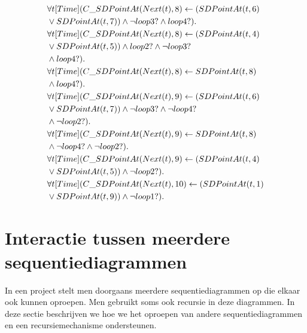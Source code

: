 \begin{align*}
	&\forall{t}[Time](C\_SDPointAt(Next(t), 8) \leftarrow (SDPointAt(t, 6) \\ &\lor SDPointAt(t, 7)) \land \lnot loop3? \land loop4?). \\
	&\forall{t}[Time](C\_SDPointAt(Next(t), 8) \leftarrow (SDPointAt(t, 4) \\ &\lor SDPointAt(t, 5)) \land loop2? \land \lnot loop3? \\ &\land loop4?). \\
	&\forall{t}[Time](C\_SDPointAt(Next(t), 8) \leftarrow SDPointAt(t, 8) \\ &\land loop4?). \\
	&\forall{t}[Time](C\_SDPointAt(Next(t), 9) \leftarrow (SDPointAt(t, 6) \\ &\lor SDPointAt(t, 7)) \land \lnot loop3? \land \lnot loop4? \\ &\land \lnot loop2?). \\
	&\forall{t}[Time](C\_SDPointAt(Next(t), 9) \leftarrow SDPointAt(t, 8) \\ &\land \lnot loop4? \land \lnot loop2?). \\
	&\forall{t}[Time](C\_SDPointAt(Next(t), 9) \leftarrow (SDPointAt(t, 4) \\ &\lor SDPointAt(t, 5)) \land \lnot loop2?). \\
	&\forall{t}[Time](C\_SDPointAt(Next(t), 10) \leftarrow (SDPointAt(t, 1) \\ &\lor SDPointAt(t, 9)) \land \lnot loop1?).
\end{align*}

\section{Interactie tussen meerdere sequentiediagrammen}\label{sec:interaction}
In een project stelt men doorgaans meerdere sequentiediagrammen op die elkaar ook kunnen oproepen. Men gebruikt soms ook recursie in deze diagrammen. In deze sectie beschrijven we hoe we het oproepen van andere sequentiediagrammen en een recursiemechanisme ondersteunen.


